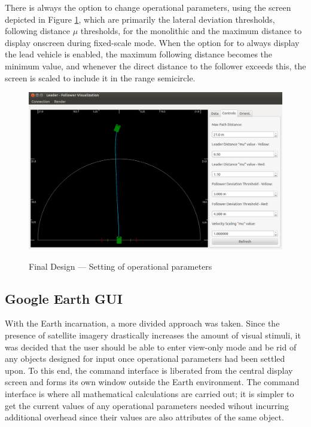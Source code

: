 \documentclass[12pt]{report}
\begin{document}
There is always the option to change operational parameters, using the screen depicted in Figure \ref{fig:finaldesopts}, which are primarily the lateral deviation thresholds, following distance $\mu$ thresholds, for the monolithic and the maximum distance to display onscreen during fixed-scale mode. When the option for to always display the lead vehicle is enabled, the maximum following distance becomes the minimum value, and whenever the direct distance to the follower exceeds this, the screen is scaled to include it in the range semicircle.

\begin{figure}[ht] \centering \label{fig:finaldesopts}
    \includegraphics[width=5in]{./figs/final_design_opts.png}
    \caption{Final Design --- Setting of operational parameters }
\end{figure}

\subsection{Google Earth GUI} \label{sec:finaldes_earth}

With the Earth incarnation, a more divided approach was taken. Since the presence of satellite imagery drastically increases the amount of  visual stimuli, it was decided that the user should be able to enter view-only mode and be rid of any objects designed for input once operational parameters had been settled upon. To this end, the command interface is liberated from the central display screen and forms its own window outside the Earth environment. The command interface is where all mathematical calculations are carried out; it is simpler to get the current values of any operational parameters needed wihout incurring additional overhead since their values are also attributes of the same object.
\end{document}
